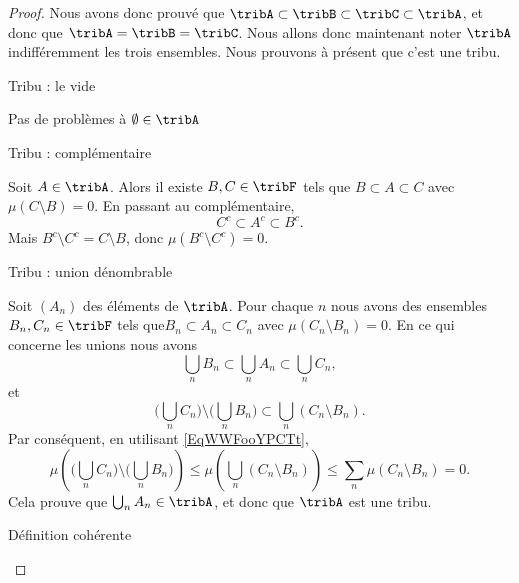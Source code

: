 \begin{proof}
    Nous avons donc prouvé que \( \tribA\subset\tribB\subset\tribC\subset \tribA\), et donc que \( \tribA=\tribB=\tribC\). Nous allons donc maintenant noter \( \tribA\) indifféremment les trois ensembles. Nous prouvons à présent que c'est une tribu.

    \begin{subproof}

        \item[Tribu : le vide]
            
            Pas de problèmes à \( \emptyset\in\tribA\)

        \item[Tribu : complémentaire]
            
            Soit \( A\in\tribA\). Alors il existe \( B,C\in\tribF\) tels que \( B\subset A\subset C\) avec \( \mu(C\setminus B)=0\). En passant au complémentaire,
            \begin{equation}
                C^c\subset A^c\subset B^c.
            \end{equation}
            Mais \( B^c\setminus C^c=C\setminus B\), donc \( \mu(B^c\setminus C^c)=0\).

        \item[Tribu : union dénombrable] 

            Soit \( (A_n)\) des éléments de \( \tribA\). Pour chaque \( n\) nous avons des ensembles \( B_n,C_n\in\tribF\) tels que\( B_n\subset A_n\subset C_n\) avec \( \mu(C_n\setminus B_n)=0\). En ce qui concerne les unions nous avons
            \begin{equation}
                \bigcup_nB_n\subset \bigcup_nA_n\subset \bigcup_nC_n,
            \end{equation}
            et 
            \begin{equation}
                \big( \bigcup_nC_n\big)\setminus\big( \bigcup_nB_n\big)\subset \bigcup_n(C_n\setminus B_n).
            \end{equation}
            Par conséquent, en utilisant \eqref{EqWWFooYPCTt},
            \begin{equation}
                \mu\left( \big( \bigcup_nC_n\big)\setminus\big( \bigcup_nB_n\big)\right)\leq\mu\left(  \bigcup_n(C_n\setminus B_n)\right)\leq\sum_n\mu(C_n\setminus B_n)=0.
            \end{equation}
            Cela prouve que \( \bigcup_nA_n\in\tribA\), et donc que \( \tribA\) est une tribu.

        \item[Définition cohérente]


\end{subproof}
\end{proof}
